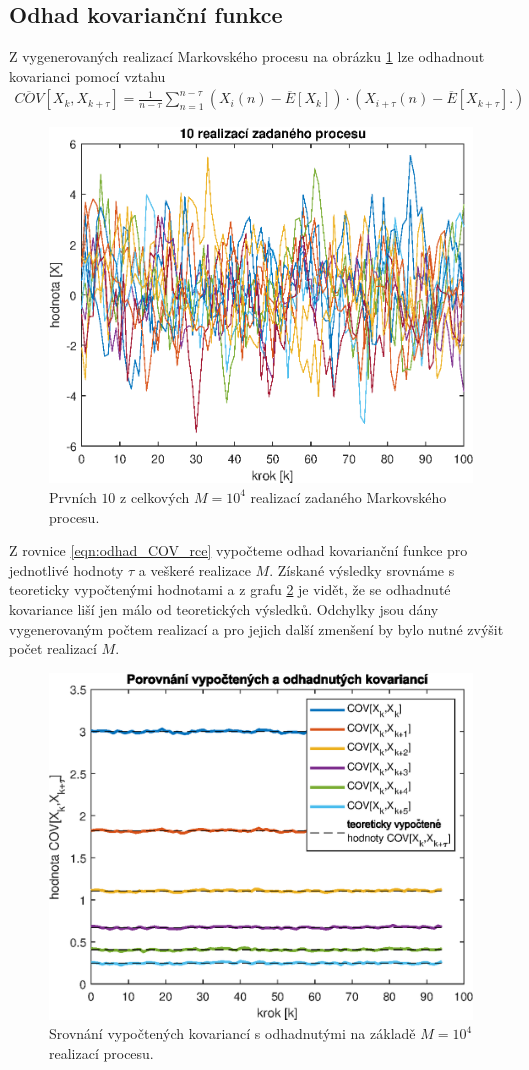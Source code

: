 \documentclass{article}
\begin{document}
		\subsection{Odhad kovarianční funkce}
			Z vygenerovaných realizací Markovského procesu na obrázku \ref{pic:priklad_01_realizace procesu} lze odhadnout kovarianci pomocí vztahu 
			\begin{align}
				\overline{COV}[X_{k},X_{k+\tau}] = \frac{1}{n-\tau}\sum_{n=1}^{n-\tau}(X_{i}(n)-\overline{E}[X_{k}])\cdot (X_{i+\tau}(n)-\overline{E}[X_{k+\tau}].)
				\label{eqn:odhad_COV_rce}
			\end{align}
			
			\begin{figure}[H]
				\centering
				\includegraphics[width=.5\textwidth]{./Graphics/priklad_01_realizace}
				\caption{Prvních \(10\) z celkových \(M=10^{4}\) realizací zadaného Markovského procesu.}
				\label{pic:priklad_01_realizace procesu}
			\end{figure}
			Z rovnice \ref{eqn:odhad_COV_rce} vypočteme odhad kovarianční funkce pro jednotlivé hodnoty \(\tau\) a veškeré realizace \(M\). Získané výsledky srovnáme s teoreticky vypočtenými hodnotami a z grafu \ref{pic:priklad_01_porovnani_kovarianci} je vidět, že se odhadnuté kovariance liší jen málo od teoretických výsledků. Odchylky jsou dány vygenerovaným počtem realizací a pro jejich další zmenšení by bylo nutné zvýšit počet realizací \(M\).
			
			\begin{figure}[H]
				\centering
				\includegraphics[width=.5\textwidth]{./Graphics/priklad_01_porovnani_kovarianci}
				\caption{Srovnání vypočtených kovariancí s odhadnutými na základě \(M=10^{4}\) realizací procesu.}
				\label{pic:priklad_01_porovnani_kovarianci}
			\end{figure}
\end{document}
